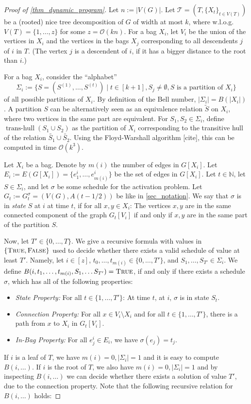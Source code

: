 \documentclass[10pt,a4paper]{article}
\numberwithin{equation}{section}
\newcommand{\N}{\mathbb{N}}
\newcommand{\set}[1]{\{ #1 \}}
\newcommand{\fromto}[2]{\set{#1, \ldots, #2}}
\newcommand{\bigO}{\mathcal{O}}
\newcommand{\True}{\textsc{True}}
\newcommand{\False}{\textsc{False}}
\DeclareMathOperator{\transhull}{trans-hull}
\begin{document}
\begin{proof}[Proof of \cref{thm_dynamic_program}]
Let $n := |V(G)|$. Let $\mathcal{T} = (T, \set{X_t}_{t \in V(T)})$ be a (rooted) nice tree decomposition of $G$ of width at most $k$, where w.l.o.g.\ $V(T) = \set{1, \ldots, z}$ for some $z = \bigO(kn)$. For a bag $X_i$, let $V_i$ be the union of the vertices in $X_i$ and the vertices in the bags $X_j$ corresponding to all descendents $j$ of $i$ in $T$. (The vertex $j$ is a descendent of $i$, if it has a bigger distance to the root than $i$.)

For a bag $X_i$, consider the \enquote{alphabet}
\[
\Sigma_i := \set{S = (S^{(1)}, \ldots, S^{(t)}) \mid t \in [k+1], S_j \neq \emptyset, S \text{ is a partition of }X_i}
\]
of all possible partitions of $X_i$. By definition of the Bell number, $|\Sigma_i| = B(|X_i|)$. A partition $S$ can be alternatively seen as an equivalence relation $\tilde{S}$ on $X_i$, where two vertices in the same part are equivalent. For $S_1, S_2 \in \Sigma_i$, define $\transhull(S_1 \cup S_2)$ as the partition of $X_i$ corresponding to the transitive hull of the relation $\tilde{S_1} \cup \tilde{S_2}$. Using the Floyd-Warshall algorithm [cite], this can be computed in time $\bigO(k^3)$. 

Let $X_i$ be a bag. Denote by $m(i)$ the number of edges in $G[X_i]$. Let $E_i := E(G[X_i]) = \fromto{e^i_1}{e^i_{m(i)}}$ be the set of edges in $G[X_i]$. Let $t \in \N$, let $S \in \Sigma_i$, and let $\sigma$ be some schedule for the activation problem. Let $G_t := G_t^\sigma = (V(G), A(t-1/2))$ be like in \cref{sec_notation}. We say that $\sigma$ is in \emph{state} $S$ at $i$ at time $t$, if for all $x, y \in X_i$: The vertices $x, y$ are in the same connected component of the graph $G_t[V_i]$ if and only if $x,y$ are in the same part of the partition $S$.

Now, let $T'\in \fromto{0}{T}$. We give a recursive formula with values in $\set{\True, \False}$ used to decide whether there exists a valid schedule of value at least $T'$. Namely, let $i \in [z]$, $t_0, \ldots, t_{m(i)} \in \fromto{0}{T'}$, and $S_1, \ldots, S_{T'} \in \Sigma_i$. We define $B(i, t_1, \ldots, t_{m(i)}, S_1, \ldots S_{T'}) = \True$, if and only if there exists a schedule $\sigma$, which has all of the following properties:
\begin{itemize}
\item \emph{State Property:} For all $t \in \fromto{1}{T'}$: At time $t$, at $i$, $\sigma$
 is in state $S_t$.
\item \emph{Connection Property:} For all $x \in V_i \setminus X_i$ and for all $t \in \fromto{1}{T'}$, there is a path from $x$ to $X_i$ in $G_t[V_i]$.
\item \emph{In-Bag Property:} For all $e^i_j \in E_i$, we have $\sigma(e_j) = t_j$.
\end{itemize}
If $i$ is a leaf of $T$, we have $m(i) = 0, |\Sigma_i|=1$ and it is easy to compute $B(i, \ldots)$. If $i$ is the root of $T$, we also have $m(i) = 0, |\Sigma_i| = 1$ and by inspecting $B(i, \ldots)$ we can decide whether there exists a solution of value $T'$, due to the connection property. Note that the following recursive relation for $B(i, \ldots)$ holds:


\end{proof}
\end{document}
